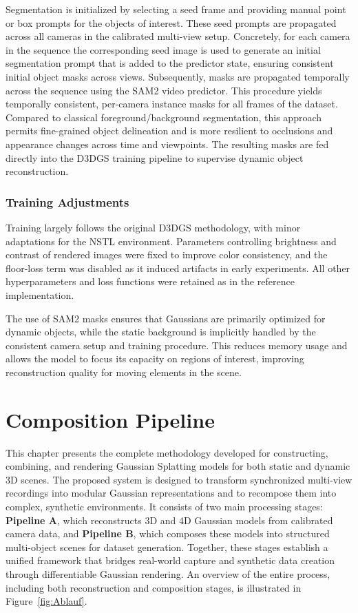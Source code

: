 Segmentation is initialized by selecting a seed frame and providing manual point or box prompts for the objects of interest. These seed prompts are propagated across all cameras in the calibrated multi-view setup. Concretely, for each camera in the sequence the corresponding seed image is used to generate an initial segmentation prompt that is added to the predictor state, ensuring consistent initial object masks across views. Subsequently, masks are propagated temporally across the sequence using the SAM2 video predictor. This procedure yields temporally consistent, per-camera instance masks for all frames of the dataset. Compared to classical foreground/background segmentation, this approach permits fine-grained object delineation and is more resilient to occlusions and appearance changes across time and viewpoints. The resulting masks are fed directly into the D3DGS training pipeline to supervise dynamic object reconstruction.


\subsubsection{Training Adjustments}

Training largely follows the original D3DGS methodology, with minor adaptations for the NSTL environment. 
Parameters controlling brightness and contrast of rendered images were fixed to improve color consistency, and the floor-loss term was disabled as it induced artifacts in early experiments.
All other hyperparameters and loss functions were retained as in the reference implementation.

The use of SAM2 masks ensures that Gaussians are primarily optimized for dynamic objects, while the static background is implicitly handled by the consistent camera setup and training procedure. 
This reduces memory usage and allows the model to focus its capacity on regions of interest, improving reconstruction quality for moving elements in the scene.




\section{Composition Pipeline}
\label{sec:compositionpipeline}

This chapter presents the complete methodology developed for constructing, combining, and rendering Gaussian Splatting models for both static and dynamic 3D scenes. 
The proposed system is designed to transform synchronized multi-view recordings into modular Gaussian representations and to recompose them into complex, synthetic environments. 
It consists of two main processing stages: \textbf{Pipeline A}, which reconstructs 3D and 4D Gaussian models from calibrated camera data, and \textbf{Pipeline B}, which composes these models into structured multi-object scenes for dataset generation. 
Together, these stages establish a unified framework that bridges real-world capture and synthetic data creation through differentiable Gaussian rendering. 
An overview of the entire process, including both reconstruction and composition stages, is illustrated in Figure~\ref{fig:Ablauf}.

